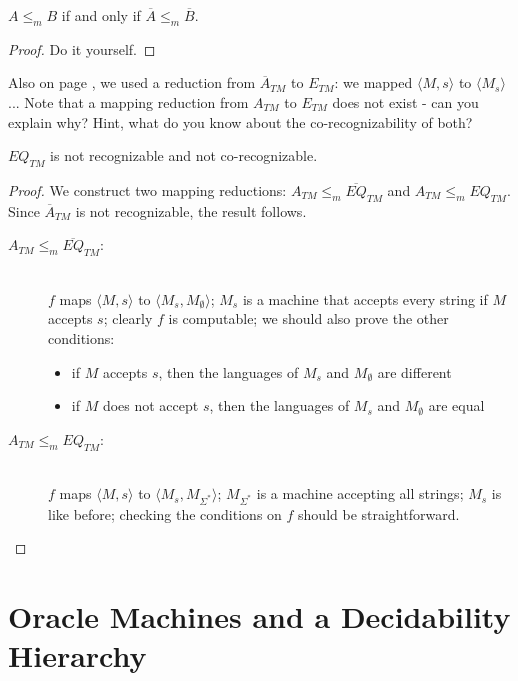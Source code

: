 \begin{theorem}
$A \leq_m B$ if and only if  $\overline{A} \leq_m \overline{B}$.
\end{theorem}
\begin{proof}
Do it yourself.
\end{proof}


Also on page \pageref{nonreductie1}, we used a reduction from
$\overline{A}_{TM}$ to $E_{TM}$: we mapped $\langle M,s \rangle$ to
$\langle M_s \rangle$ ...  Note that a mapping reduction from
$A_{TM}$ to $E_{TM}$ does not exist - can you explain why? Hint, 
what do you know about the co-recognizability of both?


\begin{theorem}
$EQ_{TM}$ is not recognizable and not co-recognizable.
\end{theorem}
\begin{proof}
We construct two mapping reductions: $A_{TM} \leq_m
\overline{EQ}_{TM}$ and $A_{TM} \leq_m EQ_{TM}$. Since
$\overline{A}_{TM}$ is not recognizable, the result follows.
\begin{description}
\item[$A_{TM} \leq_m \overline{EQ}_{TM}$:] ~\\ 
$f$ maps $\langle M,s \rangle$ to $\langle M_s,M_{\emptyset} \rangle$;
  $M_s$ is a machine that accepts every string if $M$ accepts $s$; clearly
  $f$ is computable; we should also prove the other conditions:
\begin{itemize}
\item if $M$ accepts $s$, then the languages of $M_s$ and $M_{\emptyset}$ are
  different
\item if $M$ does not accept $s$, then the languages of $M_s$ and $M_{\emptyset}$
  are equal
\end{itemize}

\item[$A_{TM} \leq_m EQ_{TM}$:] ~\\
$f$ maps $\langle M,s \rangle$ to $\langle M_s,M_{\Sigma^*}
  \rangle$; $M_{\Sigma^*}$ is a machine accepting all strings; $M_s$
  is like before; checking the conditions on $f$ should be
straightforward.
\end{description}
\end{proof}

\section{Oracle Machines and a Decidability Hierarchy}

